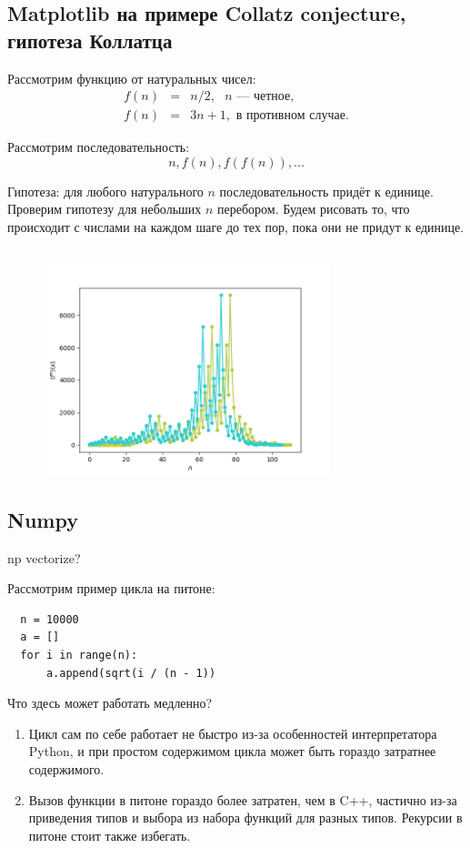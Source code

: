 \documentclass{book}
\begin{document}
\subsection{Matplotlib на примере Collatz conjecture, гипотеза Коллатца}

Рассмотрим функцию от натуральных чисел:
\begin{eqnarray}
    f(n) & = & n / 2, \text{ $n$ --- четное}, \\
    f(n) & = & 3 n + 1, \text{ в противном случае}.
\end{eqnarray}

Рассмотрим последовательность:
\begin{equation}
  n, f(n), f(f(n)), ...
\end{equation}

Гипотеза: для любого натурального $n$ последовательность придёт к единице.
Проверим гипотезу для небольших $n$ перебором. Будем рисовать то, что происходит с числами на
каждом шаге до тех пор, пока они не придут к единице.

\inputminted{python}{collatz.py}

\begin{figure}[p]
  \centering
  \includegraphics[width=8.3cm]{collatz.png}
\end{figure}

\subsection{Numpy}

np vectorize?

Рассмотрим пример цикла на питоне:
\begin{verbatim}
  n = 10000
  a = []
  for i in range(n):
      a.append(sqrt(i / (n - 1))
\end{verbatim}
Что здесь может работать медленно?
\begin{enumerate}
    \item Цикл сам по себе работает не быстро из-за особенностей интерпретатора
        Python, и при простом содержимом цикла может быть гораздо затратнее
        содержимого.
    \item Вызов функции в питоне гораздо более затратен, чем в C++, частично
        из-за приведения типов и выбора из набора функций для разных типов.
        Рекурсии в питоне стоит также избегать.
\end{enumerate}
\end{document}
